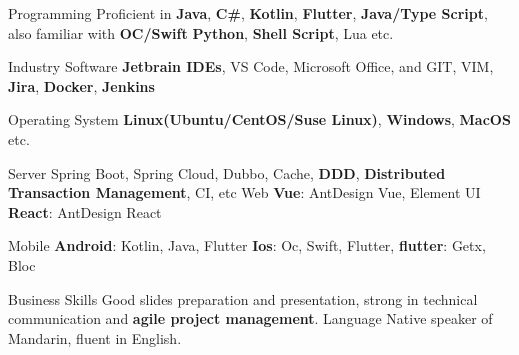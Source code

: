 

\begin{cvskills}

  \cvskill
    {Programming} %
    {Proficient in \textbf{Java}, \textbf{C\#}, \textbf{Kotlin}, \textbf{Flutter}, \textbf{Java/Type Script}, also familiar with \textbf{OC/Swift} \textbf{Python}, \textbf{Shell Script}, Lua etc.} %

  \cvskill
    {Industry Software} %
    {\textbf{Jetbrain IDEs}, VS Code, Microsoft Office, and GIT, VIM, \textbf{Jira}, \textbf{Docker}, \textbf{Jenkins}
    }%

  \cvskill
    {Operating System} %
    {\textbf{Linux(Ubuntu/CentOS/Suse Linux)}, \textbf{Windows}, \textbf{MacOS} etc. } %


  \cvskill
    {Server} %
    {Spring Boot, Spring Cloud, Dubbo, Cache, \textbf{DDD}, \textbf{Distributed Transaction Management}, CI, etc } %
  \cvskill
    {Web} %
    {\textbf{Vue}: AntDesign Vue, Element UI \textbf{React}: AntDesign React } %

  \cvskill
    {Mobile} %
    {\textbf{Android}: Kotlin, Java, Flutter \textbf{Ios}: Oc, Swift, Flutter, \textbf{flutter}: Getx, Bloc } %
    
  \cvskill
    {Business Skills} %
    {Good slides preparation and presentation, strong in technical communication and \textbf{agile project management}.} %
  \cvskill
    {Language} %
    {Native speaker of Mandarin, fluent in English.} %
\end{cvskills}

